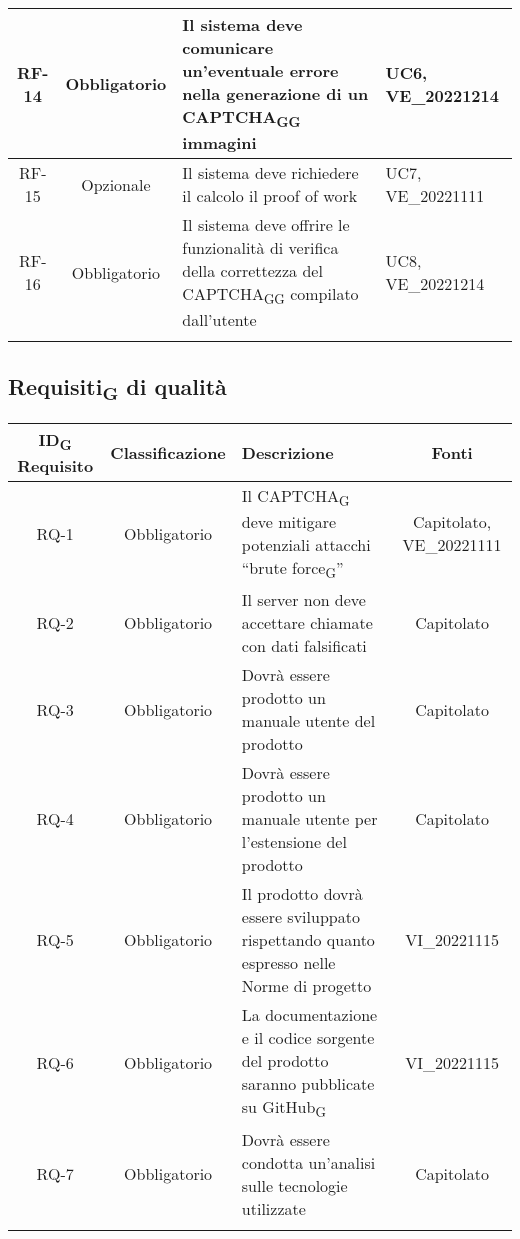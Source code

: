 \begin{tabularx}{\textwidth}{| c | c | X | X |}
 \hline
 RF-14 & Obbligatorio & Il sistema deve comunicare un'eventuale errore nella generazione di un CAPTCHA\textsubscript{G}\textsubscript{G} immagini & UC6, VE\_20221214\\
 \hline
 RF-15 & Opzionale & Il sistema deve richiedere il calcolo il proof of work & UC7, VE\_20221111\\
 \hline
 RF-16 & Obbligatorio & Il sistema deve offrire le funzionalità di verifica della correttezza del CAPTCHA\textsubscript{G}\textsubscript{G} compilato dall'utente & UC8, VE\_20221214\\
 \hline
 \caption{Requisiti\textsubscript{G} funzionali}
\end{tabularx}

\subsection{Requisiti\textsubscript{G} di qualità}
\renewcommand\tabularxcolumn[1]{>{\Centering}m{#1}}
\begin{tabularx}{\textwidth}{| c | c | X | c |} 
 \hline
 \textbf{ID\textsubscript{G} Requisito} & \textbf{Classificazione} & \textbf{Descrizione} & \textbf{Fonti} \\
 \hline
 RQ-1 & Obbligatorio & Il CAPTCHA\textsubscript{G} deve mitigare potenziali attacchi “brute force\textsubscript{G}” & Capitolato, VE\_20221111\\
 \hline
  RQ-2 & Obbligatorio & Il server non deve accettare chiamate con dati falsificati & Capitolato\\
 \hline
 RQ-3 & Obbligatorio & Dovrà essere prodotto un manuale utente del prodotto & Capitolato\\
 \hline
 RQ-4 & Obbligatorio & Dovrà essere prodotto un manuale utente per l'estensione del prodotto &  Capitolato\\
 \hline
 RQ-5 & Obbligatorio & Il prodotto dovrà essere sviluppato rispettando quanto espresso nelle Norme di progetto & VI\_20221115\\
 \hline
 RQ-6 & Obbligatorio & La documentazione e il codice sorgente del prodotto saranno pubblicate su GitHub\textsubscript{G} & VI\_20221115\\
 \hline
 RQ-7 & Obbligatorio & Dovrà essere condotta un'analisi sulle tecnologie utilizzate & Capitolato\\
 \hline
 \caption{Requisiti\textsubscript{G} di qualità}
\end{tabularx}

